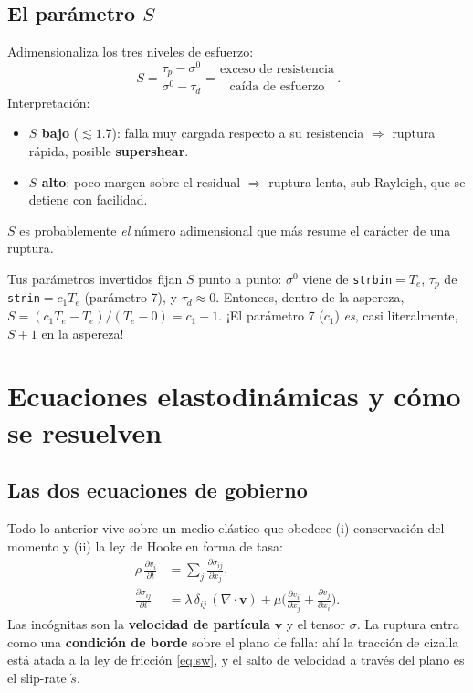 \documentclass[11pt,a4paper]{article}
\newcommand{\pd}[2]{\frac{\partial #1}{\partial #2}}
\newcommand{\vv}[1]{\mathbf{#1}}
\newcommand{\taup}{\tau_p}
\newcommand{\taud}{\tau_d}
\begin{document}
\subsection{El parámetro $S$}
Adimensionaliza los tres niveles de esfuerzo:
\begin{equation}
  \boxed{\,S=\frac{\taup-\sigma^0}{\sigma^0-\taud}
          =\frac{\text{exceso de resistencia}}{\text{caída de esfuerzo}}\,}.
\end{equation}
Interpretación:
\begin{itemize}
  \item \textbf{$S$ bajo} ($\lesssim1.7$): falla muy cargada respecto a su
        resistencia $\Rightarrow$ ruptura rápida, posible \textbf{supershear}.
  \item \textbf{$S$ alto}: poco margen sobre el residual $\Rightarrow$ ruptura
        lenta, sub-Rayleigh, que se detiene con facilidad.
\end{itemize}
$S$ es probablemente \emph{el} número adimensional que más resume el carácter de
una ruptura.

\begin{codebox}
Tus parámetros invertidos fijan $S$ punto a punto: $\sigma^0$ viene de
\texttt{strbin}$=T_e$, $\taup$ de \texttt{strin}$=c_1 T_e$ (parámetro 7), y
$\taud\approx0$. Entonces, dentro de la aspereza,
$S=(c_1 T_e - T_e)/(T_e-0)=c_1-1$. ¡El parámetro 7 ($c_1$) \emph{es}, casi
literalmente, $S+1$ en la aspereza!
\end{codebox}

\section{Ecuaciones elastodinámicas y cómo se resuelven}

\subsection{Las dos ecuaciones de gobierno}
Todo lo anterior vive sobre un medio elástico que obedece (i) conservación del
momento y (ii) la ley de Hooke en forma de tasa:
\begin{align}
  \rho\,\pd{v_i}{t} &= \sum_j \pd{\sigma_{ij}}{x_j}, \label{eq:mom}\\
  \pd{\sigma_{ij}}{t} &= \lambda\,\delta_{ij}\,(\nabla\!\cdot\!\vv{v})
        +\mu\Big(\pd{v_i}{x_j}+\pd{v_j}{x_i}\Big). \label{eq:hk}
\end{align}
Las incógnitas son la \textbf{velocidad de partícula} $\vv{v}$ y el tensor
$\sigma$. La ruptura entra como una \textbf{condición de borde} sobre el plano de
falla: ahí la tracción de cizalla está atada a la ley de fricción
\eqref{eq:sw}, y el salto de velocidad a través del plano es el slip-rate
$\dot s$.
\end{document}
